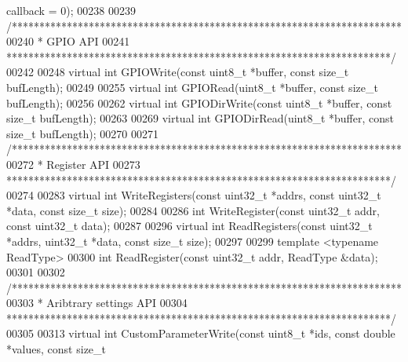 \begin{DoxyCode}
      callback = 0);
00238 
00239     \textcolor{comment}{/***********************************************************************}
00240 \textcolor{comment}{     * GPIO API}
00241 \textcolor{comment}{     **********************************************************************/}
00242 
00248     \textcolor{keyword}{virtual} \textcolor{keywordtype}{int} GPIOWrite(\textcolor{keyword}{const} uint8\_t *buffer, \textcolor{keyword}{const} \textcolor{keywordtype}{size\_t} bufLength);
00249 
00255     \textcolor{keyword}{virtual} \textcolor{keywordtype}{int} GPIORead(uint8\_t *buffer, \textcolor{keyword}{const} \textcolor{keywordtype}{size\_t} bufLength);
00256 
00262     \textcolor{keyword}{virtual} \textcolor{keywordtype}{int} GPIODirWrite(\textcolor{keyword}{const} uint8\_t *buffer, \textcolor{keyword}{const} \textcolor{keywordtype}{size\_t} bufLength);
00263 
00269     \textcolor{keyword}{virtual} \textcolor{keywordtype}{int} GPIODirRead(uint8\_t *buffer, \textcolor{keyword}{const} \textcolor{keywordtype}{size\_t} bufLength);
00270 
00271     \textcolor{comment}{/***********************************************************************}
00272 \textcolor{comment}{     * Register API}
00273 \textcolor{comment}{     **********************************************************************/}
00274 
00283     \textcolor{keyword}{virtual} \textcolor{keywordtype}{int} WriteRegisters(\textcolor{keyword}{const} uint32\_t *addrs, \textcolor{keyword}{const} uint32\_t *data, \textcolor{keyword}{const} \textcolor{keywordtype}{size\_t} size);
00284 
00286     \textcolor{keywordtype}{int} WriteRegister(\textcolor{keyword}{const} uint32\_t addr, \textcolor{keyword}{const} uint32\_t data);
00287 
00296     \textcolor{keyword}{virtual} \textcolor{keywordtype}{int} ReadRegisters(\textcolor{keyword}{const} uint32\_t *addrs, uint32\_t *data, \textcolor{keyword}{const} \textcolor{keywordtype}{size\_t} size);
00297 
00299     \textcolor{keyword}{template} <\textcolor{keyword}{typename} ReadType>
00300     \textcolor{keywordtype}{int} ReadRegister(\textcolor{keyword}{const} uint32\_t addr, ReadType &data);
00301 
00302     \textcolor{comment}{/***********************************************************************}
00303 \textcolor{comment}{     * Aribtrary settings API}
00304 \textcolor{comment}{     **********************************************************************/}
00305 
00313     \textcolor{keyword}{virtual} \textcolor{keywordtype}{int} CustomParameterWrite(\textcolor{keyword}{const} uint8\_t *ids, \textcolor{keyword}{const} \textcolor{keywordtype}{double} *values, \textcolor{keyword}{const} \textcolor{keywordtype}{size\_t} 

\end{DoxyCode}
